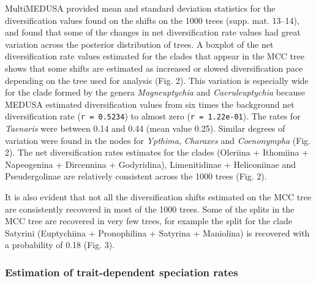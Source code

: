 \documentclass[10pt]{article}
\begin{document}
MultiMEDUSA provided mean and standard deviation statistics for the
diversification values found on the shifts on the 1000 trees (supp. mat.
13--14), and found that some of the changes in net diversification rate
values had great variation across the posterior distribution of trees. A
boxplot of the net diversification rate values estimated for the clades
that appear in the MCC tree shows that some shifts are estimated as
increased or slowed diversification pace depending on the tree used for
analysis (Fig. 2). This variation is especially wide for the clade
formed by the genera \emph{Magneuptychia} and \emph{Caeruleuptychia}
because MEDUSA estimated diversification values from six times the
background net diversification rate (\texttt{r = 0.5234}) to almost zero
(\texttt{r = 1.22e-01}). The rates for \emph{Taenaris} were between 0.14
and 0.44 (mean value 0.25). Similar degrees of variation were found in
the nodes for \emph{Ypthima}, \emph{Charaxes} and \emph{Coenonympha}
(Fig. 2). The net diversification rates estimates for the clades
(Oleriina + Ithomiina + Napeogenina + Dircennina + Godyridina),
Limenitidinae + Heliconiinae and Pseudergolinae are relatively
consistent across the 1000 trees (Fig. 2).

It is also evident that not all the diversification shifts estimated on
the MCC tree are consistently recovered in most of the 1000 trees. Some
of the splits in the MCC tree are recovered in very few trees, for
example the split for the clade Satyrini (Euptychiina + Pronophilina +
Satyrina + Maniolina) is recovered with a probability of 0.18 (Fig. 3).

\subsubsection*{Estimation of trait-dependent speciation
rates}
\end{document}
